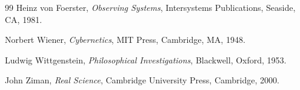\documentclass[12pt, openright, twoside]{book}
\begin{document}
\begin{thebibliography}{99}
Heinz von Foerster,
\textit{Observing Systems},
Intersystems Publications, Seaside, CA, 1981.

Norbert Wiener,
\textit{Cybernetics},
MIT Press, Cambridge, MA, 1948.

Ludwig Wittgenstein,
\textit{Philosophical Investigations},
Blackwell, Oxford, 1953.

John Ziman,
\textit{Real Science},
Cambridge University Press, Cambridge, 2000.

\end{thebibliography}
\end{document}
